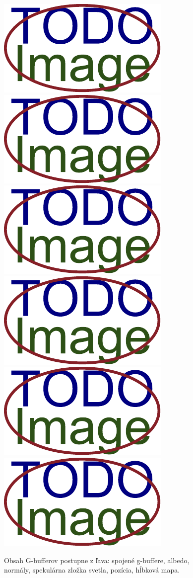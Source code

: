 \begin{figure}[h]\centering
  \centering
  \includegraphics[width=0.33\linewidth]{obrazky-figures/placeholder.pdf}\hfill
  \includegraphics[width=0.33\linewidth]{obrazky-figures/placeholder.pdf}\hfill
  \includegraphics[width=0.33\linewidth]{obrazky-figures/placeholder.pdf}\hfill\\
  \includegraphics[width=0.33\linewidth]{obrazky-figures/placeholder.pdf}\hfill
  \includegraphics[width=0.33\linewidth]{obrazky-figures/placeholder.pdf}\hfill
  \includegraphics[width=0.33\linewidth]{obrazky-figures/placeholder.pdf}\hfill
  \caption{Obsah G-bufferov postupne z ľava: spojené g-buffere, albedo, normály, spekulárna zložka svetla, pozícia, hĺbková mapa.}
  \label{G-buffers}
\end{figure}

